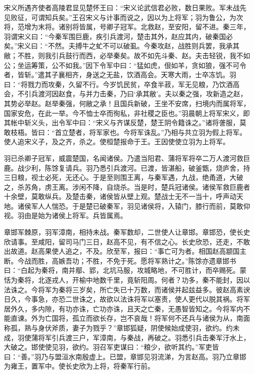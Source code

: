 \documentclass[]{article}
\begin{document}
宋义所遇齐使者高陵君显见楚怀王曰：``宋义论武信君必败，数日果败。军未战先见败征，可谓知兵矣。''王召宋义与计事而说之，因以为上将军；羽为鲁公，为次将，范增为末将。诸别将皆属，号卿子冠军。北救赵，至安阳，留不进。秦三年，羽谓宋义曰：``今秦军围巨鹿，疾引兵渡河，楚击其外，赵应其内，破秦国必矣。''宋义曰：``不然。夫搏牛之虻不可以破虱。今秦攻赵，战胜则兵罢，我承其敝；不胜，则我引兵鼓行而西，必举秦矣。故不如先斗秦、赵。夫击轻锐，我不如公；坐运筹策，公不如我。''因下令军中曰：``猛如虎，佷如羊，贪如狼，强不可令者，皆斩。''遣其子襄相齐，身送之无盐，饮酒高会。天寒大雨，士卒冻饥。羽曰：``将戮力而攻秦，久留不行。今岁饥民贫，卒食半菽，军无见粮，乃饮酒高会，不引兵渡河因赵食，与并力击秦，乃曰`承其敝'。夫以秦之强，攻新造之赵，其势必举赵。赵举秦强，何敝之承！且国兵新破，王坐不安席，扫境内而属将军，国家安危，在此一举。今不恤士卒而徇私，非社稷之臣也。''羽晨朝上将军宋义，即其帐中斩义头，出令军中曰：``宋义与齐谋反楚，楚王阴令籍诛之。''诸将詟服，莫敢枝梧。皆曰：``首立楚者，将军家也。今将军诛乱。''乃相与共立羽为假上将军。使人追宋义子，及之齐，杀之。使桓楚报命于王。王因使使立羽为上将军。

羽已杀卿子冠军，威震楚国，名闻诸侯。乃遣当阳君、蒲将军将卒二万人渡河救巨鹿。战少利，陈馀复请兵。羽乃悉引兵渡河。已渡，皆湛船，破釜甑，烧庐舍，持三日粮，视士必死，无还心。于是至则围王离，与秦军遇，九战，绝甬道，大破之，杀苏角，虏王离。涉闲不降，自烧杀。当是时，楚兵冠诸侯。诸侯军救巨鹿者十余壁，莫敢纵兵。及楚击秦，诸侯皆从壁上观。楚战士无不一当十，呼声动天地。诸侯军人人惴恐。于是楚已破秦军，羽见诸侯将，入辕门，膝行而前，莫敢仰视。羽由是始为诸侯上将军。兵皆属焉。

章邯军棘原，羽军漳南，相持未战。秦军数却，二世使人让章邯。章邯恐，使长史欣请事。至咸阳，留司马门三日，赵高不见，有不信之心。长史欣恐，还走，不敢出故道。赵高果使人追之，不及。欣至军，报曰：``事亡可为者。相国赵高颛国主断。今战而胜，高嫉吾功；不胜，不免于死。愿将军熟计之。''陈馀亦遗章邯书曰：``白起为秦将，南并鄢、郢，北坑马服，攻城略地，不可胜计，而卒赐死。蒙恬为秦将，北逐戎人，开榆中地数千里，竟斩阳周。何者？功多，秦不能封，因以法诛之。今将军为秦将三岁矣，所亡失已十万数，而诸侯并起兹益多。彼赵高素谀日久，今事急，亦恐二世诛之，故欲以法诛将军以塞责，使人更代以脱其祸。将军居外久，多内隙，有功亦诛，亡功亦诛，且天之亡秦，无愚智皆知之。今将军内不能直谏。外为亡国将，孤立而欲长存，岂不哀哉！将军何不还兵与诸侯为从，南面称孤，熟与身伏斧质，妻子为戮乎？''章邯狐疑，阴使候始成使羽，欲约。约未成，羽使蒲将军引兵渡三户，军漳南，与秦战，再破之。羽悉引兵击秦军汙水上，大破之。邯使使见羽，欲约。羽召军吏谋曰：``粮少，欲听其约。''军吏皆曰：``善。''羽乃与盟洹水南殷虚上。已盟，章邯见羽流涕，为言赵高。羽乃立章邯为雍王，置军中。使长史欣为上将，将秦军行前。
\end{document}

